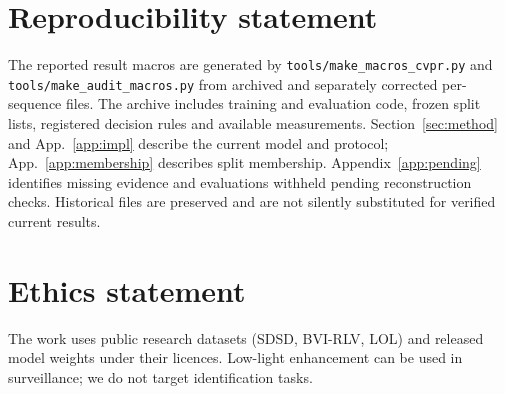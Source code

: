 \section*{Reproducibility statement}
The reported result macros are generated by
\texttt{tools/make\_macros\_cvpr.py} and
\texttt{tools/make\_audit\_macros.py} from archived and separately corrected
per-sequence files. The archive includes training and evaluation code, frozen split lists,
registered decision rules and available measurements.
Section~\ref{sec:method} and App.~\ref{app:impl} describe the current model
and protocol; App.~\ref{app:membership} describes split membership.
Appendix~\ref{app:pending} identifies missing evidence and evaluations
withheld pending reconstruction checks. Historical files are preserved and
are not silently substituted for verified current results.

\section*{Ethics statement}
The work uses public research datasets (SDSD, BVI-RLV, LOL) and released model weights under their licences. Low-light enhancement can be used in surveillance; we do not target identification tasks.
